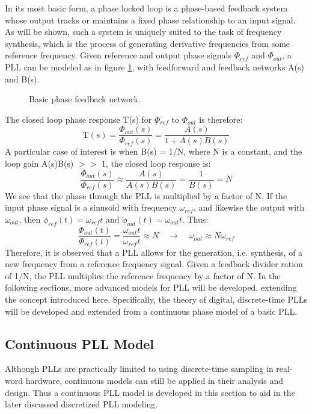 
	In its most basic form, a phase locked loop is a phase-based feedback system whose output tracks or maintains a fixed phase relationship to an input signal. As will be shown, such a system is uniquely suited to the task of frequency synthesis, which is the process of generating derivative frequencies from some reference frequency. Given reference and output phase signals $\Phi_{ref}$ and $\Phi_{out}$, a PLL can be modeled as in figure \ref{fig:basic_fb}, with feedforward and feedback networks A(s) and B(s). 
	\begin{figure}[htb!]
		\center
		\caption{Basic phase feedback network.}
		\label{fig:basic_fb}
	\end{figure}
	\FloatBarrier
	The closed loop phase response T(s) for $\Phi_{ref}$ to $\Phi_{out}$ is therefore:
	\begin{equation}
		\mathrm{T}(s) = \frac{\Phi_{out}(s)}{\Phi_{ref}(s)} = \frac{A(s)}{1+A(s)B(s)}
	\end{equation}
	A particular case of interest is when B(s) = 1/N, where N is a constant, and the loop gain A(s)B(s) $>>$ 1, the closed loop response is:
	\begin{equation}\label{mult_by_n}
		\frac{\Phi_{out}(s)}{\Phi_{ref}(s)} \approx \frac{A(s)}{A(s)B(s)} = \frac{1}{B(s)} = N
	\end{equation}
	We see that the phase through the PLL is multiplied by a factor of N. If the input phase signal is a sinusoid with frequency $\omega_{ref}$, and likewise the output with $\omega_{out}$, then $\phi_{ref}(t)=\omega_{ref}t$ and $\phi_{out}(t)=\omega_{out}t$. Thus:
	\begin{equation}\label{mult_by_n}
		\frac{\Phi_{out}(t)}{\Phi_{ref}(t)} = \frac{\omega_{out}t}{\omega_{ref}t} \approx N \hspace{1em} \rightarrow \hspace{1em} \omega_{out} \approx N\omega_{ref}
	\end{equation}
	Therefore, it is observed that a PLL allows for the generation, i.e. synthesis, of a new frequency from a reference frequency signal. Given a feedback divider ration of 1/N, the PLL multiplies the reference frequency by a factor of N. In the following sections, more advanced models for PLL will be developed, extending the concept introduced here. Specifically, the theory of digital, discrete-time PLLs will be developed and extended from a continuous phase model of a basic PLL.

	\subsection{Continuous PLL Model}
		Although PLLs are practically limited to using discrete-time sampling in real-word hardware, continuous models can still be applied in their analysis and design. Thus a continuous PLL model is developed in this section to aid in the later discussed discretized PLL modeling.

